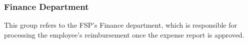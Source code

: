 \subsubsection{Finance Department}

This group refers to the FSP's Finance department, which is responsible for processing the employee's reimbursement once the expense report is approved. 
 

